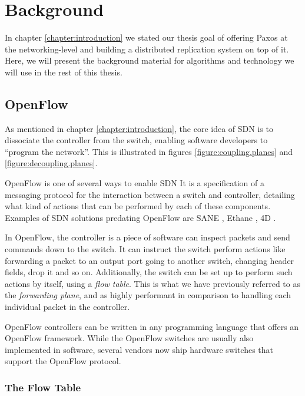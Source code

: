 \chapter{Background}
\label{chapter:background}

In chapter \ref{chapter:introduction} we stated our thesis goal of offering
Paxos at the networking-level and building a distributed replication system
on top of it.
%
Here, we will present the background material for algorithms and technology
we will use in the rest of this thesis.

\section{OpenFlow}
\label{chapter:openflow.background}

As mentioned in chapter \ref{chapter:introduction}, the core idea of
\acs{SDN} is to dissociate the controller from the switch, enabling software
developers to ``program the network''.  This is illustrated in figures
\ref{figure:coupling.planes} and \vref{figure:decoupling.planes}.

OpenFlow \cite{McKeown:2008:OEI:1355734.1355746,openflow-1.0} is one of
several ways to enable \acf{SDN}
%
It is a specification of a messaging protocol for the interaction between
a switch and controller, detailing what kind of actions that can be
performed by each of these components.
%
Examples of \ac{SDN} solutions predating OpenFlow are SANE
\cite{Casado:2006:SPA:1267336.1267346}, Ethane
\cite{Casado:2007:ETC:1282427.1282382}, 4D
\cite{Greenberg:2005:CSA:1096536.1096541}.

In OpenFlow, the controller is a piece of software can inspect packets and
send commands down to the switch.  It can instruct the switch perform actions like
forwarding a packet to an output port going to another switch, changing
header fields, drop it and so on.
%
Additionally, the switch can be set up to perform such actions by itself,
using a \textit{flow table}.  This is what we have previously referred to as
the \textit{forwarding plane}, and as highly performant in comparison to
handling each individual packet in the controller.

OpenFlow controllers can be written in any programming language that offers
an OpenFlow framework.  While the OpenFlow switches are usually also
implemented in software, several vendors now ship hardware switches that
support the OpenFlow protocol.

\subsection{The Flow Table}
\label{chapter:theory.flow.table}

